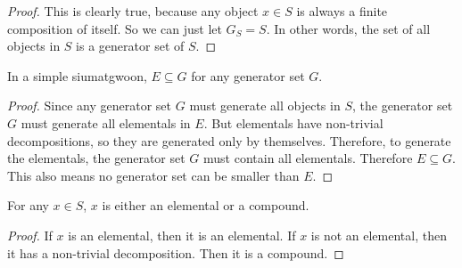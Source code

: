 \begin{proof}
    This is clearly true, because any object $x\in S$ is always a finite composition of itself. So we can just let $G_S = S$. In other words, the set of all objects in $S$ is a generator set of $S$.
\end{proof}

\begin{lemma}\label{lem:elementals-are-in-every-generator-set}
    In a simple siumatgwoon, $E\subseteq G$ for any generator set $G$.
\end{lemma}
\begin{proof}
    Since any generator set $G$ must generate all objects in $S$, the generator set $G$ must generate all elementals in $E$. But elementals have non-trivial decompositions, so they are generated only by themselves. Therefore, to generate the elementals, the generator set $G$ must contain all elementals. Therefore $E\subseteq G$. This also means no generator set can be smaller than $E$.
\end{proof}

\begin{lemma}\label{lem:elementals-are-not-compounds}
    For any $x\in S$, $x$ is either an elemental or a compound.
\end{lemma}
\begin{proof}
    If $x$ is an elemental, then it is an elemental. If $x$ is not an elemental, then it has a non-trivial decomposition. Then it is a compound.
\end{proof}

